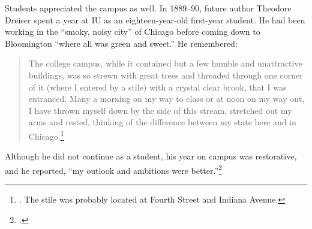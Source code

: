 \documentclass[
  american,
  letterpaper,
]{scrreprt}
\begin{document}
Students appreciated the campus as well. In 1889--90, future author
Theodore Dreiser spent a year at IU as an eighteen-year-old first-year
student. He had been working in the ``smoky, noisy city'' of Chicago
before coming down to Bloomington ``where all was green and sweet.'' He
remembered:

\begin{quote}
The college campus, while it contained but a few humble and unattractive
buildings, was so strewn with great trees and threaded through one
corner of it (where I entered by a stile) with a crystal clear brook,
that I was entranced. Many a morning on my way to class or at noon on my
way out, I have thrown myself down by the side of this stream, stretched
out my arms and rested, thinking of the difference between my state here
and in Chicago.\footnote{. The stile was
  probably located at Fourth Street and Indiana Avenue.}
\end{quote}

Although he did not continue as a student, his year on campus was
restorative, and he reported, ``my outlook and ambitions were
better.''\footnote{.}
\end{document}
